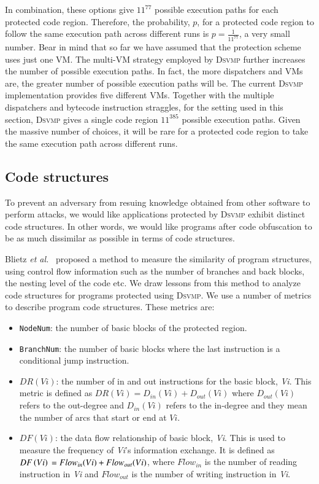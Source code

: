 \documentclass[preprint,12pt,3p]{elsarticle}
\newcommand{\DSVMP}{\textsc{Dsvmp}\xspace}
\begin{document}
In combination, these options give $11^{77}$ possible execution paths for each protected code region.
Therefore, the probability, $p$, for a protected code region to follow the same execution path across
different runs is $p= \frac{1}{{{{11}^{77}}}}$,
a very small number.
Bear in mind that so far we have assumed that the protection scheme uses just one VM.
The multi-VM strategy employed by \DSVMP further increases the number of possible execution paths.
In fact, the more dispatchers and VMs are, the greater number of possible execution paths will be.
The current \DSVMP implementation provides five different VMs. Together with the multiple dispatchers
and bytecode instruction straggles, for the setting used in this section, \DSVMP gives a single code region
$11^{385}$ possible execution paths. Given the massive number of choices, it will be rare for
a protected code region to take the same execution path across different runs.




\subsection{Code structures}
To prevent an adversary from resuing knowledge obtained from other software to perform attacks,
we would like applications protected by \DSVMP exhibit distinct code structures. In other words,
we would like programs after code obfuscation to be as much dissimilar as possible in terms of code structures.


Blietz \emph{et al.}~\cite{18blietz2006software} proposed a method to measure the similarity of program structures,
using control flow information such as the number of branches and back blocks, the nesting level of the code etc.
We draw lessons from this method to analyze code structures for programs protected using \DSVMP.
We use a number of metrics to describe program code structures. These metrics are:

\begin{itemize}
\item \texttt{NodeNum}: the number of basic blocks of the protected region.
\item \texttt{BranchNum}: the number of basic blocks where the last instruction is a conditional jump instruction.
\item $DR(Vi)$: the number of in and out instructions for the basic block, \emph{Vi}. This metric is defined as $DR(Vi) = {D_{in}}(Vi) + {D_{out}}(Vi)$ where ${D_{out}}\left( {Vi} \right)$ refers to the out-degree and ${D_{in}}\left( {Vi} \right)$ refers to the in-degree and they mean the number of arcs that start or end at $Vi$.
\item $DF(Vi)$: the data flow relationship of basic block, \emph{Vi}. This is used to measure the frequency of \emph{Vi}'s information exchange. It is defined as $DF\left( {Vi} \right){\rm{ }} = {\rm{ }}Flo{w_{in}}(Vi) + Flo{w_{out}}(Vi)$, where $Flo{w_{in}}$ is the number of reading instruction in \emph{Vi} and $Flo{w_{out}}$ is the number of writing instruction in \emph{Vi}.
\end{itemize}
\end{document}
